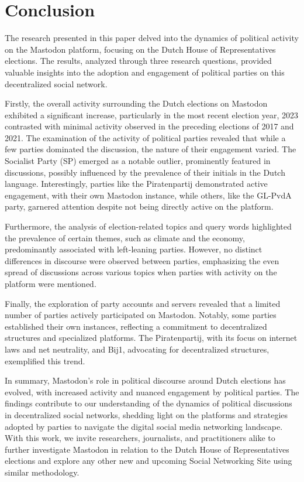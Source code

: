 \section{Conclusion}


The research presented in this paper delved into the dynamics of political activity on the Mastodon platform, focusing on the Dutch House of Representatives elections. The results, analyzed through three research questions, provided valuable insights into the adoption and engagement of political parties on this decentralized social network.

Firstly, the overall activity surrounding the Dutch elections on Mastodon exhibited a significant increase, particularly in the most recent election year, 2023 contrasted with minimal activity observed in the preceding elections of 2017 and 2021. The examination of the activity of political parties revealed that while a few parties dominated the discussion, the nature of their engagement varied. The Socialist Party (SP) emerged as a notable outlier, prominently featured in discussions, possibly influenced by the prevalence of their initials in the Dutch language. Interestingly, parties like the Piratenpartij demonstrated active engagement, with their own Mastodon instance, while others, like the GL-PvdA party, garnered attention despite not being directly active on the platform.

Furthermore, the analysis of election-related topics and query words highlighted the prevalence of certain themes, such as climate and the economy, predominantly associated with left-leaning parties. However, no distinct differences in discourse were observed between parties, emphasizing the even spread of discussions across various topics when parties with activity on the platform were mentioned.

Finally, the exploration of party accounts and servers revealed that a limited number of parties actively participated on Mastodon. Notably, some parties established their own instances, reflecting a commitment to decentralized structures and specialized platforms. The Piratenpartij, with its focus on internet laws and net neutrality, and Bij1, advocating for decentralized structures, exemplified this trend.

In summary, Mastodon's role in political discourse around Dutch elections has evolved, with increased activity and nuanced engagement by political parties. The findings contribute to our understanding of the dynamics of political discussions in decentralized social networks, shedding light on the platforms and strategies adopted by parties to navigate the digital social media networking landscape. With this work, we invite researchers, journalists, and practitioners alike to further investigate Mastodon in relation to the Dutch House of Representatives elections and explore any other new and upcoming Social Networking Site using similar methodology.